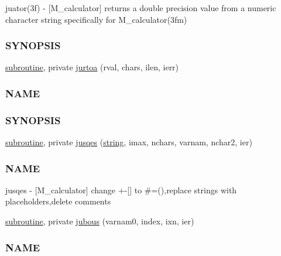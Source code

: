 \begin{DoxyCompactItemize}
\begin{DoxyCompactList}
juator(3f) -\/ \mbox{[}M\+\_\+calculator\mbox{]} returns a double precision value from a numeric character string specifically for M\+\_\+calculator(3fm) \subsubsection*{S\+Y\+N\+O\+P\+S\+IS}\end{DoxyCompactList}\item 
\hyperlink{M__stopwatch_83_8txt_acfbcff50169d691ff02d4a123ed70482}{subroutine}, private \hyperlink{namespacem__calculator_a5031622e3d493b738ac425f1fa454a60}{jurtoa} (rval, chars, ilen, ierr)
\begin{DoxyCompactList}\small\item\em \subsubsection*{N\+A\+ME}

\subsubsection*{S\+Y\+N\+O\+P\+S\+IS}\end{DoxyCompactList}\item 
\hyperlink{M__stopwatch_83_8txt_acfbcff50169d691ff02d4a123ed70482}{subroutine}, private \hyperlink{namespacem__calculator_a1c053df0b605f7d96a5982c44a9a1d11}{jusqes} (\hyperlink{what__overview_81_8txt_a74cb7e955273b9f9157b4f0c18a38849}{string}, imax, nchars, varnam, nchar2, ier)
\begin{DoxyCompactList}\small\item\em \subsubsection*{N\+A\+ME}

jusqes -\/ \mbox{[}M\+\_\+calculator\mbox{]} change +-\/\mbox{[}\mbox{]} to \#=(),replace strings with placeholders,delete comments \end{DoxyCompactList}\item 
\hyperlink{M__stopwatch_83_8txt_acfbcff50169d691ff02d4a123ed70482}{subroutine}, private \hyperlink{namespacem__calculator_a82912c44b358ca053754669f542d80af}{jubous} (varnam0, index, ixn, ier)
\begin{DoxyCompactList}\small\item\em \subsubsection*{N\+A\+ME}


\end{DoxyCompactList}
\end{DoxyCompactItemize}

